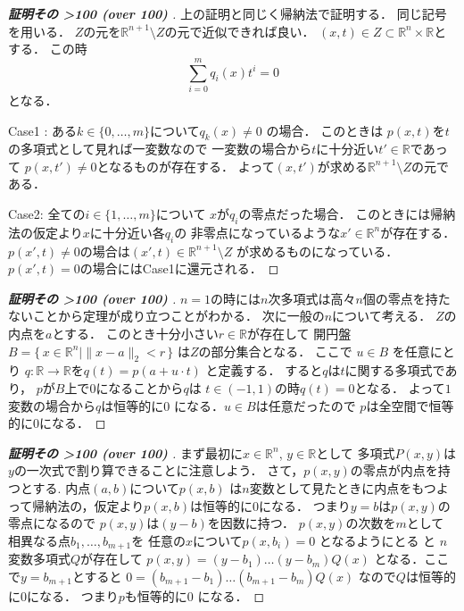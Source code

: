 \documentclass[leqno, a4paper, 12pt]{jsarticle}
\newcommand{\rr}{\mathbb{R}}
\newcounter{mycnt}%
\newcommand{\outcnt}{%
  \the\value{mycnt}%
  \ifnum\value{mycnt}>100 (over 100)\fi%
  \stepcounter{mycnt}%
}
\begin{document}
\begin{proof}[\textbf{証明その\outcnt}]
上の証明と同じく帰納法で証明する．
同じ記号を用いる．
$Z$の元を$\rr^{n+1}\setminus Z$の元で近似できれば良い．
$(x, t)\in Z\subset \rr^{n}\times \rr$とする．
この時
\[
\sum_{i=0}^{m}q_{i}(x)t^{i}=0
\]
となる．

Case1 : 
ある$k\in \{0, \dots, m\}$について$q_{k}(x)\neq 0$
の場合．
このときは
$p(x, t)$を$t$の多項式として見れば一変数なので
一変数の場合から$t$に十分近い$t'\in \rr$であって
$p(x, t')\neq 0$となるものが存在する．
よって$(x, t')$が求める$\rr^{n+1}\setminus Z$の元である．


Case2: 全ての$i\in \{1, \dots, m\}$について
$x$が$q_{i}$の零点だった場合．
このときには帰納法の仮定より$x$に十分近い各$q_{i}$の
非零点になっているような$x'\in \rr^{n}$が存在する．
$p(x', t)\neq 0$の場合は$(x', t)\in \rr^{n+1}\setminus Z$
が求めるものになっている．
$p(x', t)=0$の場合にはCase1に還元される．
\end{proof}



\begin{proof}[\textbf{証明その\outcnt}]
$n=1$の時には$n$次多項式は高々$n$個の零点を持たないことから定理が成り立つことがわかる．
次に一般の$n$について考える．
$Z$の内点を$a$とする．
このとき十分小さい$r\in \rr$が存在して
開円盤$B=
\{\, x\in \rr^{n}
\mid 
\|x-a\|_{2}<r
\, \}$
は$Z$の部分集合となる．
ここで
$u\in B$
を任意にとり
$q:\rr\to \rr$を$q(t)=p(a+u\cdot t)$
と定義する．
すると$q$は$t$に関する多項式であり，
$p$が$B$上で$0$になることから$q$は
$t\in (-1, 1)$の時$q(t)=0$となる．
よって$1$変数の場合から$q$は恒等的に$0$
になる．$u\in B$は任意だったので
$p$は全空間で恒等的に$0$になる．
\end{proof}


\begin{proof}[\textbf{証明その\outcnt}]
まず最初に$x\in \rr^{n}$, $y\in \rr$として
多項式$P(x, y)$は$y$の一次式で割り算できることに注意しよう．
さて，$p(x, y)$の零点が内点を持つとする.
内点$(a, b)$について$p(x, b)$
は$n$変数として見たときに内点をもつよって帰納法の，仮定より$p(x, b)$は恒等的に$0$になる．
つまり$y=b$は$p(x, y)$の零点になるので
$p(x, y)$は$(y-b)$を因数に持つ．
$p(x, y)$の次数を$m$として
相異なる点$b_{1}, \dots, b_{m+1}$を
任意の$x$について$p(x, b_{i})=0$
となるようにとる
と
$n$変数多項式$Q$が存在して
$p(x, y)=(y-b_{1})\dots (y-b_{m})Q(x)$
となる．ここで$y=b_{m+1}$とすると
$0=(b_{m+1}-b_{1})\dots (b_{m+1}-b_{m})Q(x)$
なので$Q$は恒等的に$0$になる．
つまり$p$も恒等的に$0$
になる．
\end{proof}
\end{document}
